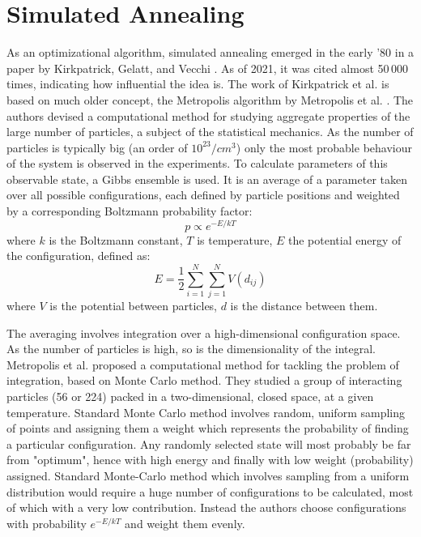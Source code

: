 \section{Simulated Annealing}
As an optimizational algorithm, simulated annealing emerged in the early '80 in a paper by Kirkpatrick, Gelatt, and Vecchi \cite{kirkpatrick1983optimization}. As of 2021, it was cited almost 50\,000 times, indicating how influential the idea is. The work of Kirkpatrick et al. is based on much older concept, the Metropolis algorithm by Metropolis et al. \cite{metropolis1953equation}. The authors devised a computational method for studying aggregate properties of the large number of particles, a subject of the statistical mechanics. As the number of particles is typically big (an order of $10^23/cm^3$) only the most probable behaviour of the system is observed in the experiments. To calculate parameters of this observable state, a Gibbs ensemble is used. It is an average of a parameter taken over all possible configurations, each defined by particle positions and weighted by a corresponding Boltzmann probability factor:
\[p\propto e^{-E/kT}\]
where $k$ is the Boltzmann constant, $T$ is temperature, $E$ the potential energy of the configuration, defined as:
\[E=\frac{1}{2}\sum_{i=1}^{N}\sum_{j=1}^{N}V(d_{ij})\]
where $V$ is the potential between particles, $d$ is the distance between them.

The averaging involves integration over a high-dimensional configuration space. As the number of particles is high, so is the dimensionality of the integral. Metropolis et al. proposed a computational method for tackling the problem of integration, based on Monte Carlo method. They studied a group of interacting particles (56 or 224) packed in a two-dimensional, closed space, at a given temperature. Standard Monte Carlo method involves random, uniform sampling of points and assigning them a weight which represents the probability of finding a particular configuration. Any randomly selected state will most probably be far from "optimum", hence with high energy and finally with low weight (probability) assigned. Standard Monte-Carlo method which involves sampling from a uniform distribution would require a huge number of configurations to be calculated, most of which with a very low contribution. Instead the authors choose configurations with probability $e^{-E/kT}$ and weight them evenly.

